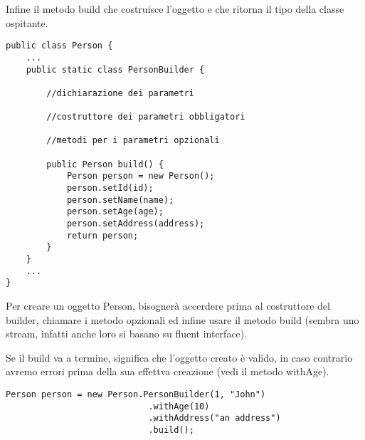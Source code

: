 Infine il metodo build che costruisce l’oggetto e che ritorna il tipo della classe ospitante.

\begin{lstlisting}
public class Person {
    ...
    public static class PersonBuilder {
        
        //dichiarazione dei parametri
        
        //costruttore dei parametri obbligatori
        
        //metodi per i parametri opzionali

        public Person build() {
            Person person = new Person();
            person.setId(id);
            person.setName(name);
            person.setAge(age);
            person.setAddress(address);
            return person;
        }
    }
    ...
} 
\end{lstlisting}

Per creare un oggetto Person, bisognerà accerdere prima al costruttore del builder, chiamare i metodo opzionali ed infine usare il metodo build 
(sembra uno stream, infatti anche loro si basano su fluent interface).

Se il build va a termine, significa che l'oggetto creato è valido, in caso contrario avremo errori prima della sua effettva creazione (vedi il metodo withAge).

\begin{lstlisting}
Person person = new Person.PersonBuilder(1, "John")
                            .withAge(10)
                            .withAddress("an address")
                            .build();
\end{lstlisting}